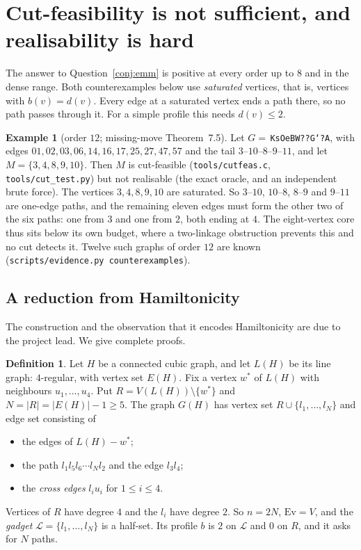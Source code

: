 \documentclass[11pt]{amsart}
\theoremstyle{definition}
\newtheorem{definition}[theorem]{Definition}
\newtheorem*{example*}{Example}
\newcommand{\Ev}{\mathrm{Ev}}
\begin{document}
\section{Cut-feasibility is not sufficient, and realisability is hard}\label{sec:hard}

The answer to Question~\ref{conj:emm} is positive at every order up to $8$ and in the dense range.
Both counterexamples below use \emph{saturated} vertices, that is, vertices with $b(v)=d(v)$. Every
edge at a saturated vertex ends a path there, so no path passes through it. For a simple profile
this needs $d(v)\le2$.

\begin{example*}[order $12$; missing-move Theorem~7.5]
Let $G=$\,\texttt{KsOeBW??G`?A}, with edges $01,\allowbreak 02,\allowbreak 03,\allowbreak 06,\allowbreak 14,\allowbreak 16,\allowbreak 17,\allowbreak 25,\allowbreak 27,\allowbreak 47,\allowbreak 57$ and the tail
$3\text{--}10\text{--}8\text{--}9\text{--}11$, and let $M=\{3,4,8,9,10\}$. Then $M$ is cut-feasible
(\texttt{tools/cutfeas.c}, \texttt{tools/cut\_test.py}) but not realisable (the exact oracle, and an
independent brute force). The vertices $3,4,8,9,10$ are saturated. So $3\text{--}10$, $10\text{--}8$,
$8\text{--}9$ and $9\text{--}11$ are one-edge paths, and the remaining eleven edges must form the
other two of the six paths: one from $3$ and one from $2$, both ending at $4$. The eight-vertex core
thus sits below its own budget, where a two-linkage obstruction prevents this and no cut detects it.
Twelve such graphs of order $12$ are known (\texttt{scripts/evidence.py counterexamples}).
\end{example*}

\subsection{A reduction from Hamiltonicity}
The construction and the observation that it encodes Hamiltonicity are due to the project lead. We
give complete proofs.

\begin{definition}\label{def:GH}
Let $H$ be a connected cubic graph, and let $L(H)$ be its line graph: $4$-regular, with vertex set
$E(H)$. Fix a vertex $w^*$ of $L(H)$ with neighbours $u_1,\dots,u_4$. Put $R=V(L(H))\setminus\{w^*\}$
and $N=|R|=|E(H)|-1\ge5$. The graph $G(H)$ has vertex set $R\cup\{l_1,\dots,l_N\}$ and edge set
consisting of
\begin{itemize}
\item the edges of $L(H)-w^*$;
\item the path $l_1l_5l_6\cdots l_Nl_2$ and the edge $l_3l_4$;
\item the \emph{cross edges} $l_iu_i$ for $1\le i\le 4$.
\end{itemize}
Vertices of $R$ have degree $4$ and the $l_i$ have degree $2$. So $n=2N$, $\Ev=V$, and the
\emph{gadget} $\mathcal L=\{l_1,\dots,l_N\}$ is a half-set. Its profile $b$ is $2$ on $\mathcal L$ and
$0$ on $R$, and it asks for $N$ paths.
\end{definition}
\end{document}
